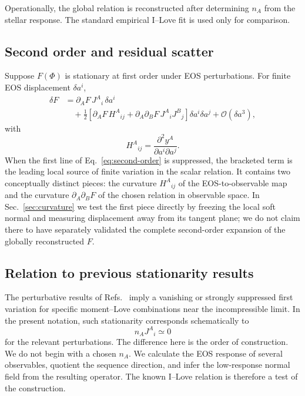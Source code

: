 Operationally, the global relation is reconstructed after determining \(n_A\) from the stellar response. The standard empirical I--Love fit is used only for comparison.

\subsection{Second order and residual scatter}

Suppose \(F(\Phi)\) is stationary at first order under EOS perturbations. For finite EOS displacement \(\delta a^i\),
\begin{align}
    \delta F
    &=
    \partial_A F\,J^A{}_i\,\delta a^i
    \nonumber\\
    &\quad+
    \frac{1}{2}
    \left[
        \partial_A F\,H^A{}_{ij}
        +
        \partial_A\partial_BF\,
        J^A{}_iJ^B{}_j
    \right]
    \delta a^i\delta a^j
    +\mathcal O(\delta a^3),
    \label{eq:second-order}
\end{align}
with
\begin{equation}
    H^A{}_{ij}
    =
    \frac{\partial^2y^A}{\partial a^i\partial a^j}.
\end{equation}
When the first line of Eq.~\eqref{eq:second-order} is suppressed, the bracketed term is the leading local source of finite variation in the scalar relation.  It contains two conceptually distinct pieces: the curvature \(H^A{}_{ij}\) of the EOS-to-observable map and the curvature \(\partial_A\partial_BF\) of the chosen relation in observable space.  In Sec.~\ref{sec:curvature} we test the first piece directly by freezing the local soft normal and measuring displacement away from its tangent plane; we do not claim there to have separately validated the complete second-order expansion of the globally reconstructed \(F\).

\subsection{Relation to previous stationarity results}

The perturbative results of Refs.~\cite{chan2016stationarity,yip2017tidal} imply a vanishing or strongly suppressed first variation for specific moment--Love combinations near the incompressible limit. In the present notation, such stationarity corresponds schematically to
\begin{equation}
    n_AJ^A{}_i\simeq0
\end{equation}
for the relevant perturbations. The difference here is the order of construction. We do not begin with a chosen \(n_A\). We calculate the EOS response of several observables, quotient the sequence direction, and infer the low-response normal field from the resulting operator. The known I--Love relation is therefore a test of the construction.
